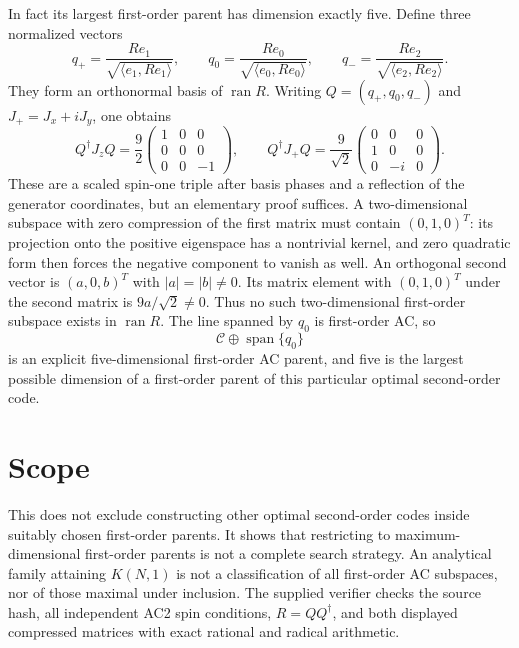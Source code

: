 \documentclass[11pt]{article}
\begin{document}
In fact its largest first-order parent has dimension exactly five.
Define three normalized vectors
\[
 q_+=\frac{Re_1}{\sqrt{\langle e_1,Re_1\rangle}},\qquad
 q_0=\frac{Re_0}{\sqrt{\langle e_0,Re_0\rangle}},\qquad
 q_-=\frac{Re_2}{\sqrt{\langle e_2,Re_2\rangle}}.
\]
They form an orthonormal basis of $\operatorname{ran}R$.
Writing $Q=(q_+,q_0,q_-)$ and $J_+=J_x+iJ_y$, one obtains
\[
 Q^\dagger J_zQ=\frac92
 \begin{pmatrix}1&0&0\\0&0&0\\0&0&-1\end{pmatrix},\qquad
 Q^\dagger J_+Q=\frac9{\sqrt2}
 \begin{pmatrix}0&0&0\\1&0&0\\0&-i&0\end{pmatrix}.
\]
These are a scaled spin-one triple after basis phases and a reflection
of the generator coordinates, but an elementary proof suffices.
A two-dimensional subspace with zero compression of the first matrix
must contain $(0,1,0)^T$: its projection onto the positive eigenspace
has a nontrivial kernel, and zero quadratic form then forces the negative
component to vanish as well. An orthogonal second vector is $(a,0,b)^T$
with $|a|=|b|\ne0$. Its matrix element with $(0,1,0)^T$ under the second
matrix is $9a/\sqrt2\ne0$. Thus no such two-dimensional first-order
subspace exists in $\operatorname{ran}R$.
The line spanned by $q_0$ is first-order AC, so
\[
 \mathcal C\oplus\operatorname{span}\{q_0\}
\]
is an explicit five-dimensional first-order AC parent, and five is the
largest possible dimension of a first-order parent of this particular
optimal second-order code.

\section*{Scope}
This does not exclude constructing other optimal second-order codes
inside suitably chosen first-order parents. It shows that restricting
to maximum-dimensional first-order parents is not a complete search
strategy. An analytical family attaining $K(N,1)$ is not a classification
of all first-order AC subspaces, nor of those maximal under inclusion.
The supplied verifier checks the source hash, all independent AC2 spin
conditions, $R=QQ^\dagger$, and both displayed compressed matrices with
exact rational and radical arithmetic.
\end{document}
